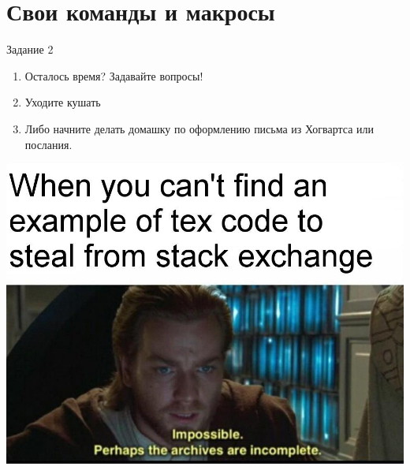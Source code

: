 \documentclass[aspectratio=169]{beamer} %
\begin{document}
\section{Свои команды и макросы} 


\begin{frame}[plain]{Задание 2} 

\begin{enumerate}
	\item Осталось время? Задавайте вопросы! 
	\item Уходите кушать 
	\item Либо начните делать домашку по оформлению письма из Хогвартса или послания. 
\end{enumerate}
\end{frame}



\begingroup
{}
\begin{frame}[plain]
\centering \includegraphics[width=0.7\linewidth]{arh.jpg}
\end{frame}
\endgroup 
\end{document}
